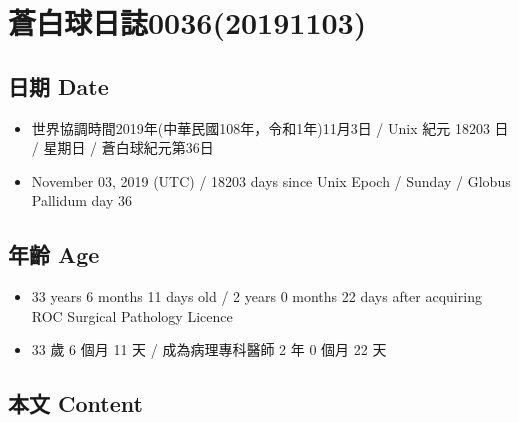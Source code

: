 \documentclass[a5paper, 12pt
]{book}
\providecommand{\tightlist}{%
  \setlength{\itemsep}{0pt}\setlength{\parskip}{0pt}}
\begin{document}
\hypertarget{ux84bcux767dux7403ux65e5ux8a8c003620191103}{%
\section{蒼白球日誌0036(20191103)}\label{ux84bcux767dux7403ux65e5ux8a8c003620191103}}

\hypertarget{ux65e5ux671f-date-35}{%
\subsection{日期 Date}\label{ux65e5ux671f-date-35}}

\begin{itemize}
\tightlist
\item
  世界協調時間2019年(中華民國108年，令和1年)11月3日 / Unix 紀元 18203 日
  / 星期日 / 蒼白球紀元第36日
\item
  November 03, 2019 (UTC) / 18203 days since Unix Epoch / Sunday /
  Globus Pallidum day 36
\end{itemize}

\hypertarget{ux5e74ux9f61-age-35}{%
\subsection{年齡 Age}\label{ux5e74ux9f61-age-35}}

\begin{itemize}
\tightlist
\item
  33 years 6 months 11 days old / 2 years 0 months 22 days after
  acquiring ROC Surgical Pathology Licence
\item
  33 歲 6 個月 11 天 / 成為病理專科醫師 2 年 0 個月 22 天
\end{itemize}

\hypertarget{ux672cux6587-content-35}{%
\subsection{本文 Content}\label{ux672cux6587-content-35}}
\end{document}
